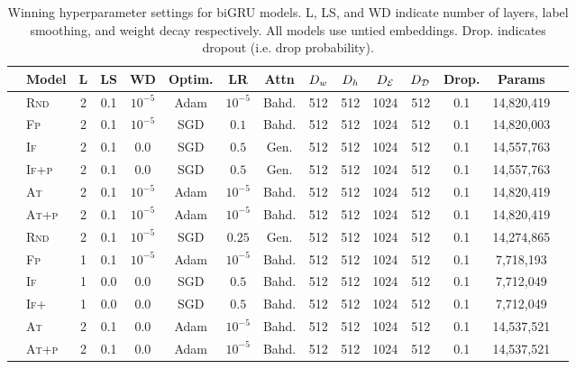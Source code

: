 \begin{table}
\small
\center
\begin{tabular}{clccc ccc cc ccccc}
\toprule
&Model & L & LS & WD & Optim. & LR & Attn & $D_{w}$ & $D_{h}$ & ${D_\mathcal{E}}$ & ${D_\mathcal{D}}$ & Drop. & Params \\
\midrule
    \parbox[t]{2mm}{} 
 & \textsc{Rnd} & 2 & 0.1 & $10^{-5}$ & Adam & $10^{-5}$ &  Bahd. & 512 & 512 & 1024 & 512 & 0.1 & 14,820,419  \\
 & \textsc{Fp} & 2 & 0.1 & $10^{-5}$ & SGD & $0.1$ &  Bahd. & 512 & 512 & 1024 & 512 & 0.1 & 14,820,003 \\ 
 & \textsc{If} & 2 & 0.1 & $0.0$ & SGD & $0.5$ &  Gen. & 512 & 512 & 1024 & 512  & 0.1 & 14,557,763 \\
 & \textsc{If+p} & 2 & 0.1 & $0.0$ & SGD & $0.5$ &  Gen. &512 & 512 & 1024 & 512  & 0.1 &14,557,763 \\
 & \textsc{At} & 2 & 0.1 & $10^{-5}$ & Adam & $10^{-5}$ &  Bahd. & 512 & 512 & 1024 & 512  & 0.1 & 14,820,419  \\
 & \textsc{At+p} & 2 & 0.1 & $10^{-5}$ & Adam & $10^{-5}$ &  Bahd. & 512 & 512 & 1024 & 512  & 0.1 & 14,820,419  \\
\midrule
    \parbox[t]{2mm}{} 
 & \textsc{Rnd} & 2 & 0.1 & $10^{-5}$ & SGD & $0.25$ &  Gen. & 512 & 512 & 1024 & 512 & 0.1 & 14,274,865 \\
 & \textsc{Fp} & 1 & 0.1 & $10^{-5}$ & Adam & $10^{-5}$ &  Bahd. & 512 & 512 & 1024 & 512 & 0.1 & 7,718,193 \\ 
 & \textsc{If} & 1 & 0.0 & $0.0$ & SGD & $0.5$ &  Bahd. &  512 & 512 & 1024 & 512  & 0.1 & 7,712,049 \\ 
 & \textsc{If+} & 1 & 0.0 & $0.0$ & SGD & $0.5$ &  Bahd. & 512 & 512 & 1024 & 512  & 0.1 & 7,712,049 \\ 
 & \textsc{At} & 2 & 0.1 & $0.0$ & Adam & $10^{-5}$ &  Bahd. &  512 & 512 & 1024 & 512  & 0.1 & 14,537,521 \\ 
 & \textsc{At+p} & 2 & 0.1 & $0.0$ & Adam & $10^{-5}$ &  Bahd. &  512 & 512 & 1024 & 512  & 0.1 & 14,537,521 \\ 
\bottomrule
\end{tabular}

\caption{Winning hyperparameter settings for biGRU models. L, LS, and WD 
indicate number of layers, label smoothing, and weight decay respectively. 
All models use untied embeddings. Drop. indicates dropout (i.e. drop probability).}
\label{tab:gruparams}
\end{table}

